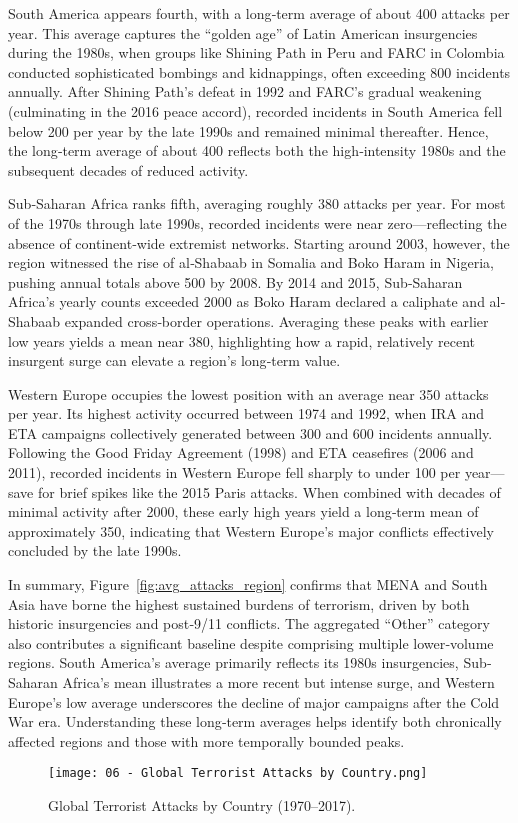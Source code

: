 South America appears fourth, with a long‐term average of about 400 attacks per year. This average captures the “golden age” of Latin American insurgencies during the 1980s, when groups like Shining Path in Peru and FARC in Colombia conducted sophisticated bombings and kidnappings, often exceeding 800 incidents annually. After Shining Path’s defeat in 1992 and FARC’s gradual weakening (culminating in the 2016 peace accord), recorded incidents in South America fell below 200 per year by the late 1990s and remained minimal thereafter. Hence, the long‐term average of about 400 reflects both the high‐intensity 1980s and the subsequent decades of reduced activity.

Sub‐Saharan Africa ranks fifth, averaging roughly 380 attacks per year. For most of the 1970s through late 1990s, recorded incidents were near zero—reflecting the absence of continent‐wide extremist networks. Starting around 2003, however, the region witnessed the rise of al‐Shabaab in Somalia and Boko Haram in Nigeria, pushing annual totals above 500 by 2008. By 2014 and 2015, Sub‐Saharan Africa’s yearly counts exceeded 2000 as Boko Haram declared a caliphate and al‐Shabaab expanded cross‐border operations. Averaging these peaks with earlier low years yields a mean near 380, highlighting how a rapid, relatively recent insurgent surge can elevate a region’s long‐term value.

Western Europe occupies the lowest position with an average near 350 attacks per year. Its highest activity occurred between 1974 and 1992, when IRA and ETA campaigns collectively generated between 300 and 600 incidents annually. Following the Good Friday Agreement (1998) and ETA ceasefires (2006 and 2011), recorded incidents in Western Europe fell sharply to under 100 per year—save for brief spikes like the 2015 Paris attacks. When combined with decades of minimal activity after 2000, these early high years yield a long‐term mean of approximately 350, indicating that Western Europe’s major conflicts effectively concluded by the late 1990s.

In summary, Figure~\ref{fig:avg_attacks_region} confirms that MENA and South Asia have borne the highest sustained burdens of terrorism, driven by both historic insurgencies and post‐9/11 conflicts. The aggregated “Other” category also contributes a significant baseline despite comprising multiple lower‐volume regions. South America’s average primarily reflects its 1980s insurgencies, Sub‐Saharan Africa’s mean illustrates a more recent but intense surge, and Western Europe’s low average underscores the decline of major campaigns after the Cold War era. Understanding these long‐term averages helps identify both chronically affected regions and those with more temporally bounded peaks.  
\vspace{0.5em}
\begin{figure}[ht]
  \centering
  \texttt{[image: 06 - Global Terrorist Attacks by Country.png]}
  \caption{Global Terrorist Attacks by Country (1970–2017).}
  \label{fig:choropleth_countries}
\end{figure}

